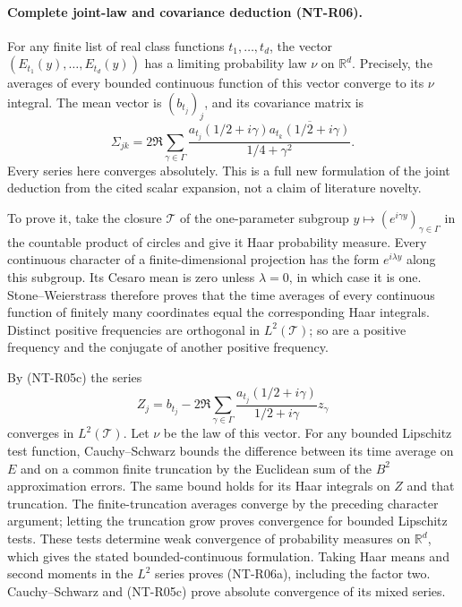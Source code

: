 \documentclass[11pt,a4paper]{article}
\begin{document}
\paragraph{Complete joint-law and covariance deduction (NT-R06).}
For any finite list of real class functions $t_1,\ldots,t_d$, the
vector $(E_{t_1}(y),\ldots,E_{t_d}(y))$ has a limiting probability
law $\nu$ on $\mathbb R^d$. Precisely, the averages of every bounded
continuous function of this vector converge to its $\nu$ integral.
The mean vector is $(b_{t_j})_j$, and its covariance matrix is
\[
 \Sigma_{jk}=2\Re\sum_{\gamma\in\Gamma}
       \frac{a_{t_j}(1/2+i\gamma)
             \overline{a_{t_k}(1/2+i\gamma)}}{1/4+\gamma^2}.
 \tag{NT-R06a}
\]
Every series here converges absolutely. This is a full new
formulation of the joint deduction from the cited scalar expansion,
not a claim of literature novelty.

To prove it, take the closure $\mathcal T$ of the one-parameter
subgroup
$y\mapsto(e^{i\gamma y})_{\gamma\in\Gamma}$ in the countable
product of circles and give it Haar probability measure. Every
continuous character of a finite-dimensional projection has the
form $e^{i\lambda y}$ along this subgroup. Its Cesaro mean is zero
unless $\lambda=0$, in which case it is one. Stone--Weierstrass
therefore proves that the time averages of every continuous
function of finitely many coordinates equal the corresponding
Haar integrals. Distinct positive frequencies are orthogonal in
$L^2(\mathcal T)$; so are a positive frequency and the conjugate of
another positive frequency.

By (NT-R05c) the series
\[
 Z_j=b_{t_j}-2\Re\sum_{\gamma\in\Gamma}
       \frac{a_{t_j}(1/2+i\gamma)}{1/2+i\gamma}z_\gamma
\]
converges in $L^2(\mathcal T)$. Let $\nu$ be the law of this vector.
For any bounded Lipschitz test function, Cauchy--Schwarz bounds the
difference between its time average on $E$ and on a common finite
truncation by the Euclidean sum of the $B^2$ approximation errors.
The same bound holds for its Haar integrals on $Z$ and that
truncation. The finite-truncation averages converge by the preceding
character argument; letting the truncation grow proves convergence
for bounded Lipschitz tests. These tests determine weak convergence
of probability measures on $\mathbb R^d$, which gives the stated
bounded-continuous formulation. Taking Haar means and second moments
in the $L^2$ series proves (NT-R06a), including the factor two.
Cauchy--Schwarz and (NT-R05c) prove absolute convergence of its
mixed series.
\end{document}
